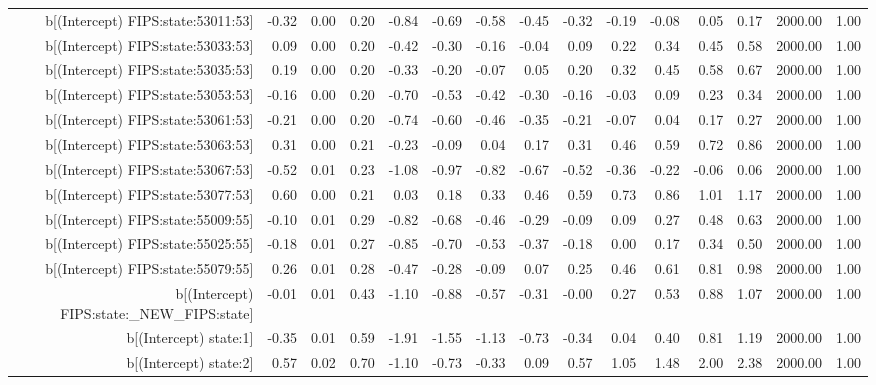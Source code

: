 \begin{table}[ht]
\begin{tabular}{rrrrrrrrrrrrrrr}
  b[(Intercept) FIPS:state:53011:53] & -0.32 & 0.00 & 0.20 & -0.84 & -0.69 & -0.58 & -0.45 & -0.32 & -0.19 & -0.08 & 0.05 & 0.17 & 2000.00 & 1.00 \\ 
  b[(Intercept) FIPS:state:53033:53] & 0.09 & 0.00 & 0.20 & -0.42 & -0.30 & -0.16 & -0.04 & 0.09 & 0.22 & 0.34 & 0.45 & 0.58 & 2000.00 & 1.00 \\ 
  b[(Intercept) FIPS:state:53035:53] & 0.19 & 0.00 & 0.20 & -0.33 & -0.20 & -0.07 & 0.05 & 0.20 & 0.32 & 0.45 & 0.58 & 0.67 & 2000.00 & 1.00 \\ 
  b[(Intercept) FIPS:state:53053:53] & -0.16 & 0.00 & 0.20 & -0.70 & -0.53 & -0.42 & -0.30 & -0.16 & -0.03 & 0.09 & 0.23 & 0.34 & 2000.00 & 1.00 \\ 
  b[(Intercept) FIPS:state:53061:53] & -0.21 & 0.00 & 0.20 & -0.74 & -0.60 & -0.46 & -0.35 & -0.21 & -0.07 & 0.04 & 0.17 & 0.27 & 2000.00 & 1.00 \\ 
  b[(Intercept) FIPS:state:53063:53] & 0.31 & 0.00 & 0.21 & -0.23 & -0.09 & 0.04 & 0.17 & 0.31 & 0.46 & 0.59 & 0.72 & 0.86 & 2000.00 & 1.00 \\ 
  b[(Intercept) FIPS:state:53067:53] & -0.52 & 0.01 & 0.23 & -1.08 & -0.97 & -0.82 & -0.67 & -0.52 & -0.36 & -0.22 & -0.06 & 0.06 & 2000.00 & 1.00 \\ 
  b[(Intercept) FIPS:state:53077:53] & 0.60 & 0.00 & 0.21 & 0.03 & 0.18 & 0.33 & 0.46 & 0.59 & 0.73 & 0.86 & 1.01 & 1.17 & 2000.00 & 1.00 \\ 
  b[(Intercept) FIPS:state:55009:55] & -0.10 & 0.01 & 0.29 & -0.82 & -0.68 & -0.46 & -0.29 & -0.09 & 0.09 & 0.27 & 0.48 & 0.63 & 2000.00 & 1.00 \\ 
  b[(Intercept) FIPS:state:55025:55] & -0.18 & 0.01 & 0.27 & -0.85 & -0.70 & -0.53 & -0.37 & -0.18 & 0.00 & 0.17 & 0.34 & 0.50 & 2000.00 & 1.00 \\ 
  b[(Intercept) FIPS:state:55079:55] & 0.26 & 0.01 & 0.28 & -0.47 & -0.28 & -0.09 & 0.07 & 0.25 & 0.46 & 0.61 & 0.81 & 0.98 & 2000.00 & 1.00 \\ 
  b[(Intercept) FIPS:state:\_NEW\_FIPS:state] & -0.01 & 0.01 & 0.43 & -1.10 & -0.88 & -0.57 & -0.31 & -0.00 & 0.27 & 0.53 & 0.88 & 1.07 & 2000.00 & 1.00 \\ 
  b[(Intercept) state:1] & -0.35 & 0.01 & 0.59 & -1.91 & -1.55 & -1.13 & -0.73 & -0.34 & 0.04 & 0.40 & 0.81 & 1.19 & 2000.00 & 1.00 \\ 
  b[(Intercept) state:2] & 0.57 & 0.02 & 0.70 & -1.10 & -0.73 & -0.33 & 0.09 & 0.57 & 1.05 & 1.48 & 2.00 & 2.38 & 2000.00 & 1.00 \\ 

\end{tabular}
\end{table}
